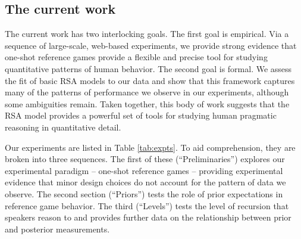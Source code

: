 \documentclass[man,noapacite]{apa2}
\begin{document}
\subsection{The current work}

The current work has two interlocking goals. The first goal is empirical. Via a sequence of large-scale, web-based experiments, we provide strong evidence that one-shot reference games provide a flexible and precise tool for studying quantitative patterns of human behavior. The second goal is formal. We assess the fit of basic RSA models to our data and show that this framework captures many of the patterns of performance we observe in our experiments, although some ambiguities remain. Taken together, this body of work suggests that the RSA model provides a powerful set of tools for studying human pragmatic reasoning in quantitative detail.

Our experiments are listed in Table \ref{tab:expts}. To aid comprehension, they are broken into three sequences. The first of these (``Preliminaries'') explores our experimental paradigm -- one-shot reference games -- providing experimental evidence that minor design choices do not account for the pattern of data we observe. The second section (``Priors'') tests the role of prior expectations in reference game behavior. The third (``Levels'') tests the level of recursion that speakers reason to and provides further data on the relationship between prior and posterior measurements.
\end{document}
